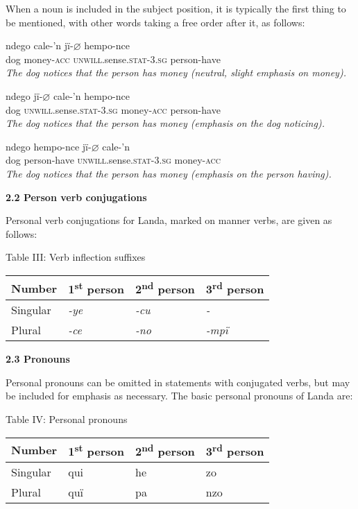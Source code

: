 \documentclass{article}[10pt]
\begin{document}
When a noun is included in the subject position, it is typically the first thing to be mentioned, with other words taking a free order after it, as follows:
\begin{exe}
\ex
\gll ndego cale-'n {j\"{i}-$\varnothing$} {hempo-nce}\\
dog money-\textsc{acc} \textsc{unwill}.sense.\textsc{stat}-3.\textsc{sg} person-have\\
\trans \emph{The dog notices that the person has money (neutral, slight emphasis on money).}

\ex
\gll ndego {j\"{i}-$\varnothing$} {cale-'n} hempo-nce\\
dog \textsc{unwill}.sense.\textsc{stat}-3.\textsc{sg} money-\textsc{acc} person-have\\
\trans \emph{The dog notices that the person has money (emphasis on the dog noticing).}

\ex
\gll ndego hempo-nce {j\"{i}-$\varnothing$} {cale-'n}\\
 dog person-have \textsc{unwill}.sense.\textsc{stat}-3.\textsc{sg} money-\textsc{acc} \\
\trans \emph{The dog notices that the person has money (emphasis on the person having).}
\end{exe}

{\bf 2.2 Person verb conjugations}

Personal verb conjugations for Landa, marked on manner verbs, are given as follows:

\begin{center}
Table III: Verb inflection suffixes\\\vspace{1.5mm}
\begin{tabular}{|l|l|l|l|}
\hline
 Number & 1\textsuperscript{st} person & 2\textsuperscript{nd} person & 3\textsuperscript{rd} person \\ \hline
 Singular & \emph{-ye} & \emph{-cu} & \emph{-} \\ \hline
Plural & \emph{-ce} & \emph{-no} & \emph{-mp\"{i}} \\ \hline
\end{tabular}
\end{center}

{\bf 2.3 Pronouns}

Personal pronouns can be omitted in statements with conjugated verbs, but may be included for emphasis as necessary. The basic personal pronouns of Landa are:

\begin{center}
Table IV: Personal pronouns\\\vspace{1.5mm}
\begin{tabular}{|l|l|l|l|}
\hline
 Number & 1\textsuperscript{st} person & 2\textsuperscript{nd} person & 3\textsuperscript{rd} person \\ \hline
 Singular & qui & he & zo \\ \hline
Plural & qu\"{i} & pa & nzo \\ \hline
\end{tabular}
\end{center}
\end{document}
